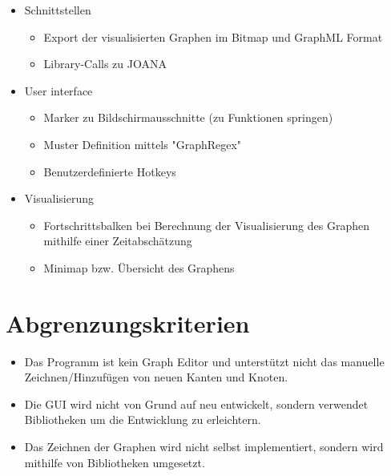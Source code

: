 \begin{itemize}
\item Schnittstellen
\begin{itemize}
\item Export der visualisierten Graphen im Bitmap und GraphML Format
\item Library-Calls zu JOANA
\end{itemize}
\item User interface
\begin{itemize}
\item Marker zu Bildschirmausschnitte (zu Funktionen springen)
\item Muster Definition mittels "GraphRegex"
\item Benutzerdefinierte Hotkeys
\end{itemize}
\item Visualisierung
\begin{itemize}
\item Fortschrittsbalken bei Berechnung der Visualisierung des Graphen mithilfe einer Zeitabschätzung
\item Minimap bzw. Übersicht des Graphens
\end{itemize}
\end{itemize}

\section{Abgrenzungskriterien}

\begin{itemize}
\item Das Programm ist kein Graph Editor und unterstützt nicht das manuelle Zeichnen/Hinzufügen von neuen Kanten und Knoten.
\item Die GUI wird nicht von Grund auf neu entwickelt, sondern verwendet Bibliotheken um die Entwicklung zu erleichtern. 
\item Das Zeichnen der Graphen wird nicht selbst implementiert, sondern wird mithilfe von Bibliotheken umgesetzt.
\end{itemize}